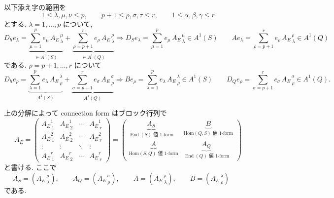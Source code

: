 \documentclass[dvipdfmx,a4paper,11pt]{article} %
\theoremstyle{definition}
\theoremstyle{remark}
\numberwithin{equation}{section}
\newcommand{\End}[0]{\operatorname{End}}
\newcommand{\Hom}[0]{\mathrm{Hom}}
\begin{document}
以下添え字の範囲を
\[
1\leq \lambda,\mu,\nu\leq p,\qquad p+1\leq \rho,\sigma,\tau\leq r,\qquad 1\leq \alpha,\beta,\gamma\leq r
\]
とする.
\(\lambda=1, \ldots, p\) について,
\[
D_he_\lambda=
\underbrace{\sum_{\mu=1}^{p} e_\mu\,{A_E}^{\,\mu}_{\ \lambda}}_{\in A^{1}(S)}
+\underbrace{
\sum_{\rho =p+1}^{r}e_\rho\,{A_E}^{\,\rho}_{\ \lambda} }
_{\in A^{1}(Q)}
\Rightarrow
D_Se_\lambda=\sum_{\mu=1}^{p}  e_\mu\,{A_E}^{\,\mu}_{\ \lambda} \in A^{1}(S) \qquad
Ae_\lambda=\sum_{\rho =p+1}^{r}e_\rho\,{A_E}^{\,\rho}_{\ \lambda} \in A^{1}(Q)
\]
である. \(\rho=p+1, \ldots, r\) について
\[
D_he_\rho=
\underbrace{\sum_{\lambda=1}^{p} e_\lambda\,{A_E}^{\,\lambda}_{\ \rho}}_{A^{1}(S)}
+\underbrace{\sum_{\sigma=p+1}^{r} e_\sigma\,{A_E}^{\,\sigma}_{\ \rho}}_{A^1(Q)}
\Rightarrow 
Be_\rho=
\sum_{\lambda=1}^{p} e_\lambda\,{A_E}^{\,\lambda}_{\ \rho} \in A^{1}(S)
\qquad
D_Qe_\rho
=\sum_{\sigma=p+1}^{r} e_\sigma\,{A_E}^{\,\sigma}_{\ \rho} \in A^1(Q).
\]

上の分解によって connection form はブロック行列で
\[
A_E=
\begin{pmatrix}
{A_E}^{1}_{\ 1} & {A_E}^{1}_{\ 2} & \cdots & {A_E}^{1}_{\ r} \\
{A_E}^{2}_{\ 1}  & {A_E}^{2}_{\ 2} & \cdots & {A_E}^{2}_{\ r} \\
\vdots & \vdots & \ddots & \vdots\\
{A_E}^{r}_{\ 1}  &{A_E}^{r}_{\ 2}  & \cdots & {A_E}^{r}_{\ r}  
\end{pmatrix}
=
\begin{pmatrix}
\underbrace{A_S}_{\text{\(\End(S)\) 値 \(1\)-form}} & \underbrace{B}_{\text{\(\Hom(Q,S)\) 値 \(1\)-form}}\\
\underbrace{A}_{\text{\(\Hom(S, Q)\) 値 \(1\)-form}} &\underbrace{A_Q}_{\text{\(\End(Q)\) 値 \(1\)-form}}
\end{pmatrix}
\]
と書ける. ここで
\[
A_S=({A_E}^{\,\mu}_{\ \lambda}),\qquad
A_Q=({A_E}^{\,\sigma}_{\ \rho}),\qquad
A=({A_E}^{\,\rho}_{\ \lambda}),\qquad
B=({A_E}^{\,\lambda}_{\ \rho}) \qquad
\]
である.
\end{document}
